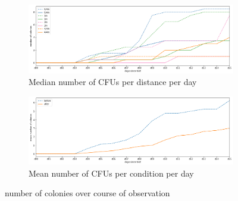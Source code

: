 \documentclass[hyperref]{labbook}
\begin{document}
\begin{figure}[H]
\begin{subfigure}{\textwidth}
\includegraphics[scale=0.5]{CFU_per_day}
\caption{Median number of CFUs per distance per day}
\end{subfigure}
\begin{subfigure}{\textwidth}
\includegraphics[scale=0.5]{mean_CFU_per_day}
\caption{Mean number of CFUs per condition per day}
\end{subfigure}
\caption{number of colonies over course of observation}
\end{figure}
\end{document}
